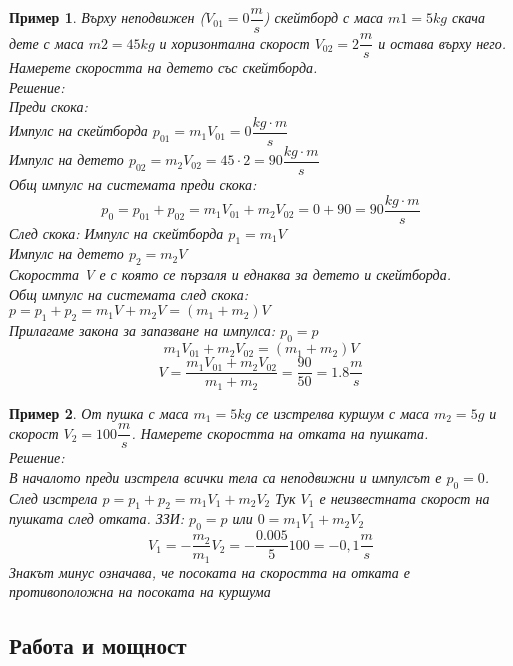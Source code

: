\documentclass[fleqn]{article}
\newtheorem{example}{Пример}[subsection]
\begin{document}
\begin{example}
Върху неподвижен ($V_{01} = 0 \dfrac{m}{s}$) скейтборд с маса $m1 = 5 kg$ скача дете с маса $m2 = 45 kg$ и хоризонтална скорост
$V_{02} = 2 \dfrac{m}{s}$ и остава върху него. Намерете скоростта на детето със скейтборда.\\
Решение: \\
Преди скока:\\
Импулс на скейтборда $p_{01} = m_1 V_{01} = 0 \dfrac{kg \cdot m}{s}$ \\
Импулс на детето $p_{02} = m_2 V_{02} = 45 \cdot 2 = 90 \dfrac{kg \cdot m}{s} $ \\
Общ импулс на системата преди скока:
$$p_0 = p_{01} + p_{02} = m_1 V_{01} + m_2 V_{02} = 0 + 90 = 90 \dfrac{kg \cdot m}{s}$$
След скока:  
Импулс на скейтборда $p_1 = m_1 V $ \\
Импулс на детето $p_2 = m_2 V $\\
Скоростта V е с която се пързаля и еднаква за детето и скейтборда. \\
Общ импулс на системата след скока: $p = p_1 + p_2 = m_1 V +  m_2 V  = (m_1 + m_2)V$ \\
Прилагаме закона за запазване на импулса: $p_0 = p$
$$m_1 V_{01} + m_2 V_{02} = (m_1 + m_2)V $$
$$V = \dfrac{m_1 V_{01} + m_2 V_{02}}{m_1 + m_2} = \dfrac{90}{50} = 1.8 \dfrac{m}{s}$$

\end{example}

\begin{example}
От пушка с маса $m_1 = 5 kg$ се изстрелва куршум с маса $m_2 = 5 g$ и скорост $V_2 = 100 \dfrac{m}{s}$. Намерете скоростта на отката на пушката. \\
Решение: \\
В началото преди изстрела всички тела са неподвижни и импулсът е $p_0 = 0$. След изстрела $p = p_1 + p_2 = m_1V_1 + m_2V_2$ Тук $V_1$ е неизвестната скорост на пушката след отката. 
ЗЗИ: $p_0 = p$ или $0 =m_1V_1 + m_2V_2$
$$V_1 = -\dfrac{m_2}{m_1} V_2 = -\dfrac{0.005}{5} 100 = -0,1 \dfrac{m}{s}$$
Знакът минус означава, че посоката на скоростта на отката е противоположна на посоката на куршума
\end{example}

\subsection{Работа и мощност}
\end{document}
